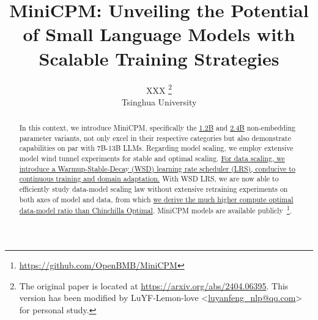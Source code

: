 \documentclass[dvipsnames]{article} %
\title{MiniCPM: Unveiling the Potential of Small Language Models with Scalable Training Strategies}
\author{
    XXX \thanks{The original paper is located at \url{https://arxiv.org/abs/2404.06395}. This version has been modified by LuYF-Lemon-love <\url{luyanfeng_nlp@qq.com}> for personal study.}\\
    Tsinghua University
}
\begin{document}
\maketitle
\begin{abstract}
In this context, we introduce MiniCPM, specifically the \uline{1.2B} and \uline{2.4B} non-embedding parameter variants, not only excel in their respective categories but also demonstrate capabilities on par with 7B-13B LLMs. Regarding model scaling, we employ extensive model wind tunnel experiments for stable and optimal scaling. \uline{For data scaling, we introduce a Warmup-Stable-Decay (WSD) learning rate scheduler (LRS), conducive to continuous training and domain adaptation.} With WSD LRS, we are now able to efficiently study data-model scaling law without extensive retraining experiments on both axes of model and data, from which \uline{we derive the much higher compute optimal data-model ratio than Chinchilla Optimal}. MiniCPM models are available publicly~\footnote{\url{https://github.com/OpenBMB/MiniCPM}}.

\end{abstract}








\newpage



\newpage

\appendix





\end{document}
